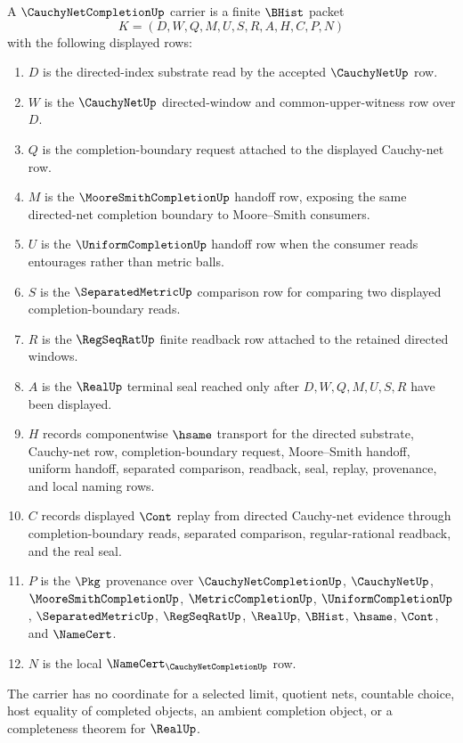 \begin{definition}
\label{def:cauchy-net-completion-carrier}
A $\CauchyNetCompletionUp$ carrier is a finite $\BHist$ packet
$$
K=(D,W,Q,M,U,S,R,A,H,C,P,N)
$$
with the following displayed rows:
\begin{enumerate}
\item $D$ is the directed-index substrate read by the accepted $\CauchyNetUp$ row.
\item $W$ is the $\CauchyNetUp$ directed-window and common-upper-witness row over $D$.
\item $Q$ is the completion-boundary request attached to the displayed Cauchy-net row.
\item $M$ is the $\MooreSmithCompletionUp$ handoff row, exposing the same directed-net completion boundary to Moore--Smith consumers.
\item $U$ is the $\UniformCompletionUp$ handoff row when the consumer reads entourages rather than metric balls.
\item $S$ is the $\SeparatedMetricUp$ comparison row for comparing two displayed completion-boundary reads.
\item $R$ is the $\RegSeqRatUp$ finite readback row attached to the retained directed windows.
\item $A$ is the $\RealUp$ terminal seal reached only after $D,W,Q,M,U,S,R$ have been displayed.
\item $H$ records componentwise $\hsame$ transport for the directed substrate, Cauchy-net row, completion-boundary request, Moore--Smith handoff, uniform handoff, separated comparison, readback, seal, replay, provenance, and local naming rows.
\item $C$ records displayed $\Cont$ replay from directed Cauchy-net evidence through completion-boundary reads, separated comparison, regular-rational readback, and the real seal.
\item $P$ is the $\Pkg$ provenance over $\CauchyNetCompletionUp$, $\CauchyNetUp$, $\MooreSmithCompletionUp$, $\MetricCompletionUp$, $\UniformCompletionUp$, $\SeparatedMetricUp$, $\RegSeqRatUp$, $\RealUp$, $\BHist$, $\hsame$, $\Cont$, and $\NameCert$.
\item $N$ is the local $\NameCert_{\CauchyNetCompletionUp}$ row.
\end{enumerate}
The carrier has no coordinate for a selected limit, quotient nets, countable choice, host equality of completed objects, an ambient completion object, or a completeness theorem for $\RealUp$.
\end{definition}

